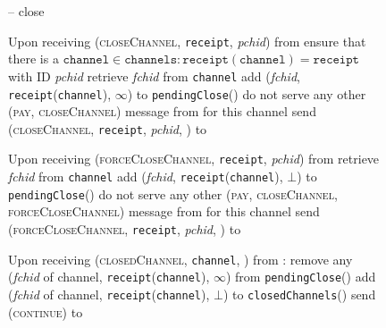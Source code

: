 \begin{figure}[H]
  \begin{systembox}{\fpaynet{} -- close}
    \begin{algorithmic}[1]
      \State Upon receiving (\textsc{closeChannel}, \texttt{receipt},
      \textit{pchid}) from \alice
      \Indent
        \State ensure that there is a $\mathtt{channel} \in \mathtt{channels}
        : \mathtt{receipt}\left(\mathtt{channel}\right) = \mathtt{receipt}$
        with ID \textit{pchid}
        \label{alg:fpaynet:close:coop:ensure}
        \State retrieve \textit{fchid} from \texttt{channel}
        \label{alg:fpaynet:close:coop:retrieve}
        \State add (\textit{fchid}, \texttt{receipt}(\texttt{channel}),
        $\infty$) to \texttt{pendingClose}(\alice)
        \label{alg:fpaynet:close:coop:mark}
        \State do not serve any other (\textsc{pay}, \textsc{closeChannel})
        message from \alice{} for this channel
        \label{alg:fpaynet:close:coop:noserve}
        \State send (\textsc{closeChannel}, \texttt{receipt}, \textit{pchid},
        \alice) to \simulator
        \label{alg:fpaynet:close:coop:send}
      \EndIndent
      \Statex

      \State Upon receiving (\textsc{forceCloseChannel}, \texttt{receipt},
      \textit{pchid}) from \alice
      \Indent
        \State retrieve \textit{fchid} from \texttt{channel}
        \label{alg:fpaynet:close:unilateral:retrieve}
        \State add (\textit{fchid}, \texttt{receipt}(\texttt{channel}),
        $\bot$) to \texttt{pendingClose}(\alice)
        \label{alg:fpaynet:close:unilateral:mark}
        \State do not serve any other (\textsc{pay}, \textsc{closeChannel},
        \textsc{forceCloseChannel}) message from \alice{} for this channel
        \label{alg:fpaynet:close:unilateral:noserve}
        \State send (\textsc{forceCloseChannel}, \texttt{receipt},
        \textit{pchid}, \alice) to \simulator
        \label{alg:fpaynet:close:unilateral:send}
      \EndIndent
      \Statex

      \State Upon receiving (\textsc{closedChannel}, \texttt{channel}, \alice)
      from \simulator:
      \Indent
        \State remove any (\textit{fchid} of channel,
        \texttt{receipt}(\texttt{channel}), $\infty$) from
        \texttt{pendingClose}(\alice)
        \State add (\textit{fchid} of channel,
        \texttt{receipt}(\texttt{channel}), $\bot$) to
        \texttt{closedChannels}(\alice)
        \label{alg:fpaynet:closedChannel:report}
        \State send (\textsc{continue}) to \simulator
      \EndIndent
      \Statex
    \end{algorithmic}
  \end{systembox}
  \caption{}
  \label{alg:fpaynet:close}
\end{figure}

